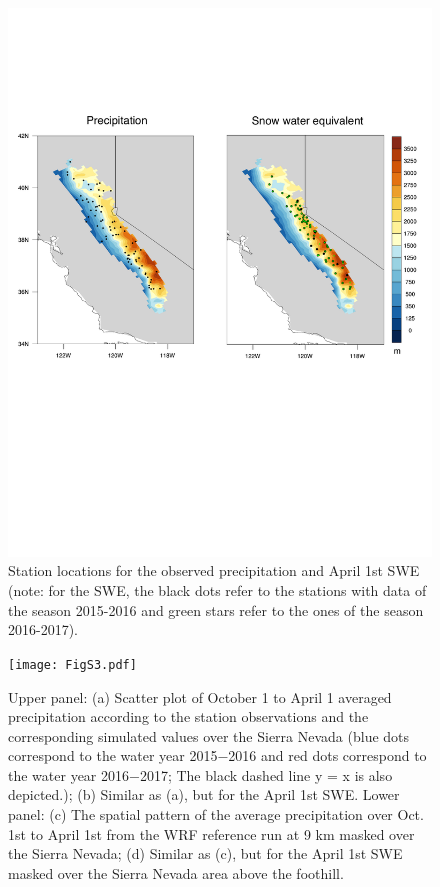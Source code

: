 \documentclass[grl]{agutexSI}
\begin{document}

\begin{figure}
\begin{center}
\includegraphics[width=6in]{FigS2.pdf}
\caption{Station locations for the observed precipitation and April 1st SWE (note: for the SWE, the black dots refer to the stations with data of the season 2015-2016 and green stars refer to the ones of the season 2016-2017).}
\end{center}
\end{figure}


\begin{figure}
\begin{center}
\texttt{[image: FigS3.pdf]}
\caption{Upper panel: (a) Scatter plot of October 1 to April 1 averaged precipitation according to the station observations and the corresponding simulated values over the Sierra Nevada (blue dots correspond to the water year 2015$-$2016 and red dots correspond to the water year 2016$-$2017; The black dashed line y = x is also depicted.); (b) Similar as (a), but for the April 1st SWE. Lower panel: (c) The spatial pattern of the average precipitation over Oct. 1st to April 1st from the WRF reference run at 9 km masked over the Sierra Nevada; (d) Similar as (c), but for the April 1st SWE masked over the Sierra Nevada area above the foothill.}
\end{center}
\end{figure}
\end{document}
